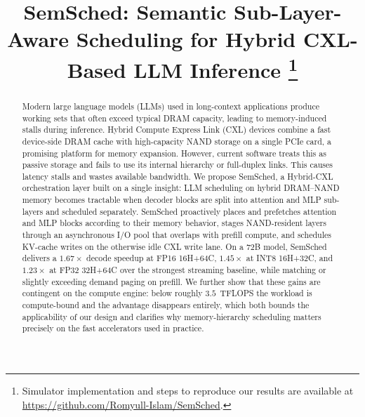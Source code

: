 \documentclass[10pt,conference,letterpaper]{IEEEtran}
\begin{document}
\title{
SemSched: Semantic Sub-Layer-Aware Scheduling for Hybrid CXL-Based LLM Inference%
\thanks{Simulator implementation and steps to reproduce our results are available at \url{https://github.com/Romyull-Islam/SemSched}.}
}

\author{
}

\maketitle

\begin{abstract}
Modern large language models (LLMs) used in long-context applications produce working sets that often exceed typical DRAM capacity, leading to memory-induced stalls during inference. Hybrid Compute Express Link (CXL) devices combine a fast device-side DRAM cache with high-capacity NAND storage on a single PCIe card, a promising platform for memory expansion. However, current software treats this as passive storage and fails to use its internal hierarchy or full-duplex links. This causes latency stalls and wastes available bandwidth. We propose SemSched, a Hybrid-CXL orchestration layer built on a single insight: LLM scheduling on hybrid DRAM--NAND memory becomes tractable when decoder blocks are split into attention and MLP sub-layers and scheduled separately. SemSched proactively places and prefetches attention and MLP blocks according to their memory behavior, stages NAND-resident layers through an asynchronous I/O pool that overlaps with prefill compute, and schedules KV-cache writes on the otherwise idle CXL write lane. On a 72B model, SemSched delivers a $1.67\times$ decode speedup at FP16 16H+64C, $1.45\times$ at INT8 16H+32C, and $1.23\times$ at FP32 32H+64C over the strongest streaming baseline, while matching or slightly exceeding demand paging on prefill. We further show that these gains are contingent on the compute engine: below roughly $3.5$~TFLOPS the workload is compute-bound and the advantage disappears entirely, which both bounds the applicability of our design and clarifies why memory-hierarchy scheduling matters precisely on the fast accelerators used in practice.
\end{abstract}
\end{document}
